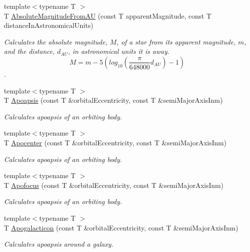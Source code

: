 \begin{DoxyCompactItemize}
{\footnotesize template$<$typename T $>$ }\\T \mbox{\hyperlink{group___e_g_x_phys-_astrophysics-_absolute_magnitude_gab25029a422f98bc7f8cea59abce3860e}{Absolute\+Magnitude\+From\+AU}} (const T apparent\+Magnitude, const T distance\+In\+Astronomical\+Units)
\begin{DoxyCompactList}\small\item\em Calculates the absolute magnitude, $M$, of a star from its apparent magnitude, $m$, and the distance, $d_{AU}$, in astronomical units it is away. \[M= m - 5 \left ( log_{10} \left ( \dfrac{\pi}{648000}d_{AU} \right ) - 1 \right )\]. \end{DoxyCompactList}\item 
{\footnotesize template$<$typename T $>$ }\\T \mbox{\hyperlink{group___e_g_x_phys-_apoapsis_gafd08a2d1d64886e7bb9bcb7ff65bc3ea}{Apoapsis}} (const T \&orbital\+Eccentricity, const T \&semi\+Major\+Axis\+Inm)
\begin{DoxyCompactList}\small\item\em Calculates apoapsis of an orbiting body. \end{DoxyCompactList}\item 
{\footnotesize template$<$typename T $>$ }\\T \mbox{\hyperlink{group___e_g_x_phys-_apoapsis_gaacffba78614c5b4d5488d8e9b8c661ee}{Apocenter}} (const T \&orbital\+Eccentricity, const T \&semi\+Major\+Axis\+Inm)
\begin{DoxyCompactList}\small\item\em Calculates apoapsis of an orbiting body. \end{DoxyCompactList}\item 
{\footnotesize template$<$typename T $>$ }\\T \mbox{\hyperlink{group___e_g_x_phys-_apoapsis_gada28ef9258703e9e32ac9e564544ae87}{Apofocus}} (const T \&orbital\+Eccentricity, const T \&semi\+Major\+Axis\+Inm)
\begin{DoxyCompactList}\small\item\em Calculates apoapsis of an orbiting body. \end{DoxyCompactList}\item 
{\footnotesize template$<$typename T $>$ }\\T \mbox{\hyperlink{group___e_g_x_phys-_apoapsis_gafef7ad033b39c29cdfe624cd48a6d616}{Apogalacticon}} (const T \&orbital\+Eccentricity, const T \&semi\+Major\+Axis\+Inm)
\begin{DoxyCompactList}\small\item\em Calculates apoapsis around a galaxy. \end{DoxyCompactList}\item 

\end{DoxyCompactItemize}
